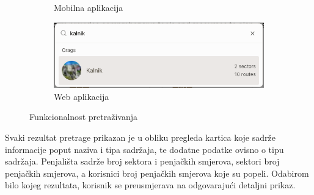 \begin{figure}[H]
\begin{subfigure}[b]{0.35\textwidth}
        \caption{Mobilna aplikacija}
        \label{fig:pretrazivanje_web_1}
    \end{subfigure}
    \hfill
    \begin{subfigure}[b]{0.6\textwidth}
        \centering
        \includegraphics[width=\textwidth]{images/implementacija/web/search_searching.png}
        \caption{Web aplikacija}
        \label{fig:pretrazivanje_web_2}
    \end{subfigure}
    \caption{Funkcionalnost pretraživanja}
    \label{fig:pretrazivanje_side_by_side}
\end{figure}

Svaki rezultat pretrage prikazan je u obliku pregleda kartica koje sadrže informacije poput naziva i tipa sadržaja, te dodatne podatke ovisno o tipu sadržaja. Penjališta sadrže broj sektora i penjačkih smjerova, sektori broj penjačkih smjerova, a korisnici broj penjačkih smjerova koje su popeli. Odabirom bilo kojeg rezultata, korisnik se preusmjerava na odgovarajući detaljni prikaz. 


